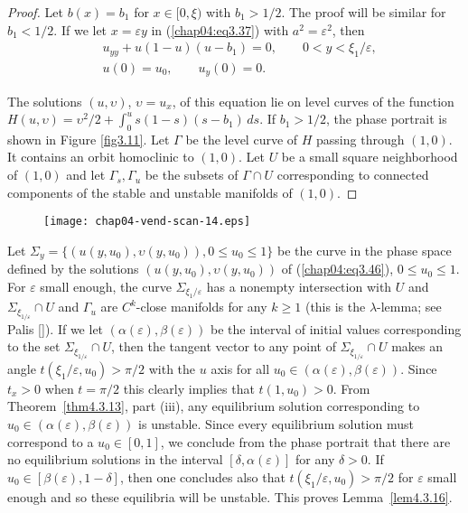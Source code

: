 \documentclass{surv-l}
\theoremstyle{plain}
\theoremstyle{definition}
\numberwithin{equation}{section}
\numberwithin{figure}{chapter}
\begin{document}
\begin{proof} Let $b(x)=b_{1}$ for $x\in[0,\xi)$ with $b_{1}>1/2$. The proof will be similar for $b_{1}<1/2$. If we let $x =\varepsilon y$ in (\ref{chap04:eq3.37}) with $a^{2}=\varepsilon^{2}$, then
\begin{equation}\label{chap04:eq3.46}
\begin{split}
&u_{yy}+u(1-u)(u-b_{1})=0,\qquad 0<y<\xi_{1}/\varepsilon,\\
&u(0)=u_{0},\qquad u_{y}(0)=0.
\end{split}
\end{equation}

The solutions $(u,\upsilon)$, $\upsilon=u_{x}$, of this equation lie on level curves of the function $H(u,\upsilon) =\upsilon^{2}/2+\int_{0}^{u}s(1-s)(s-b_{1})\,ds$. If $b_{1}>1/2$, the phase portrait is shown in Figure \ref{fig3.11}. Let $\Gamma$ be the level curve of $H$ passing through $(1,0)$. It contains an orbit homoclinic to $(1,0)$. Let $U$ be a small square neighborhood of $(1,0)$ and let $\Gamma_{s},\Gamma_{u}$ be the subsets of $\Gamma\cap U$ corresponding to connected components of the stable and unstable manifolds of $(1,0)$.
\end{proof}
\begin{figure}
\texttt{[image: chap04-vend-scan-14.eps]}
\caption{}\label{fig3.12}
\end{figure}

Let $\Sigma_{y}=\{(u(y,u_{0}),\upsilon(y, u_{0})), 0\leq u_{0}\leq 1\}$ be the curve in the phase space defined by the solutions $(u(y, u_{0}), \upsilon(y, u_{0}))$ of (\ref{chap04:eq3.46}), $0\leq u_{0}\leq 1$. For $\varepsilon$ small enough, the curve $\Sigma
_{\xi_{1}/\varepsilon}$ has a nonempty intersection with $U$ and $\Sigma_{\xi_{1/\varepsilon}}\cap U$ and $\Gamma_{u}$ are $C^{k}$-close manifolds for any $k\geq 1$ (this is the $\lambda$-lemma; see Palis [\citeyear{1969p}]). If we let $(\alpha(\varepsilon), \beta(\varepsilon))$ be the interval of initial values corresponding to the set $\Sigma_{\xi_{1/\varepsilon}}\cap U$, then the tangent vector to any point of $\Sigma_{\xi_{1/\varepsilon}}\cap U$ makes an angle $t(\xi_{1}/\varepsilon, u_{0})>\pi/2$ with the $u$ axis for all $u_{0}\in(\alpha(\varepsilon), \beta(\varepsilon))$. Since $t_{x}>0$ when $t=\pi/2$ this clearly implies that $t(1, u_{0})>0$. From Theorem~\ref{thm4.3.13}, part (iii), any equilibrium solution corresponding to $u_{0}\in(\alpha(\varepsilon), \beta(\varepsilon))$ is unstable. Since every equilibrium solution must correspond to a $u_{0}\in[0,1]$, we conclude from the phase portrait that there are no equilibrium solutions in the interval $[\delta,\alpha(\varepsilon)]$ for any $\delta>0$. If $u_{0}\in[\beta(\varepsilon), 1-\delta]$, then one concludes also that $t(\xi_{1}/\varepsilon,u_{0})>\pi/2$ for $\varepsilon$ small enough and so these equilibria will be unstable. This proves Lemma~\ref{lem4.3.16}.
\end{document}
